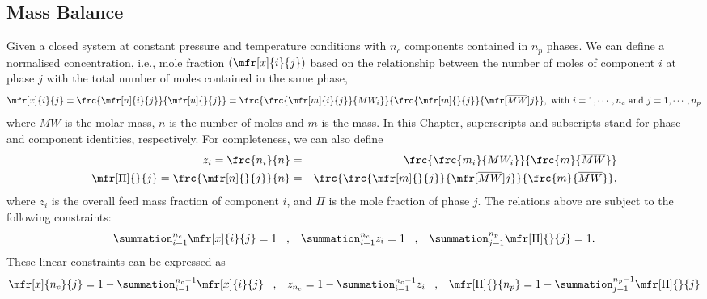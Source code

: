 \documentclass[12pt,a4paper,oneside]{report}%
\begin{document}
\subsection{Mass Balance}\label{Chapter:ThermodynamicFormulation:Section:MassBalance}
Given a closed system at constant pressure and temperature conditions with $n_{c}$ components contained in $n_{p}$ phases. We can define a normalised concentration, i.e., mole fraction $\left(\mfr[x]{i}{j}\right)$ based on the relationship between the number of moles of component $i$ at phase $j$ with the total number of moles contained in the same phase, 
\begin{equation}
    \mfr[x]{i}{j} = \frc{\mfr[n]{i}{j}}{\mfr[n]{}{j}} = \frc{\frc{\mfr[m]{i}{j}}{MW_{i}}}{\frc{\mfr[m]{}{j}}{\mfr[\overline{MW}]{}{j}}}, \hfill \text{ with } i=1, \cdots, n_{c} \text{ and } j=1, \cdots, n_{p}
\label{Chapter:ThermodynamicFormulation:Eqn:MoleFractionDef}
\end{equation}
where $MW$ is the molar mass, $n$ is the number of moles and $m$ is the mass. In this Chapter, superscripts and subscripts stand for phase and component identities, respectively.  For completeness, we can also define
\begin{eqnarray}
    z_{i} = \frc{n_{i}}{n} &=& \frc{\frc{m_{i}}{MW_{i}}}{\frc{m}{\overline{MW}}}\label{Chapter:ThermodynamicFormulation:Eqn:FeedFractionDef} \\
    \mfr[\Pi]{}{j} = \frc{\mfr[n]{}{j}}{n} &=& \frc{\frc{\mfr[m]{}{j}}{\mfr[\overline{MW}]{}{j}}}{\frc{m}{\overline{MW}}},\label{Chapter:ThermodynamicFormulation:Eqn:PhaseFractionDef} 
\end{eqnarray}
where $z_{i}$ is the overall feed mass fraction of component $i$, and $\Pi$ is the mole fraction of phase $j$. The relations above are subject to the following constraints:
\begin{equation}
    \summation_{i=1}^{n_{c}}\mfr[x]{i}{j} = 1 \;\;\;,\;\;\; \summation_{i=1}^{n_{c}}z_{i} = 1 \;\;\;,\;\;\; \summation_{j=1}^{n_{p}}\mfr[\Pi]{}{j} = 1. \label{Chapter:ThermodynamicFormulation:Eqn:FractionConstraints1}
\end{equation}
These linear constraints can be expressed as
\begin{equation}
    \mfr[x]{n_{c}}{j}= 1 - \summation_{i=1}^{n_{c}-1}\mfr[x]{i}{j} \;\;\;,\;\;\; z_{n_{c}}= 1 - \summation_{i=1}^{n_{c}-1}z_{i} \;\;\;,\;\;\; \mfr[\Pi]{}{n_{p}} = 1 - \summation_{j=1}^{n_{p}-1}\mfr[\Pi]{}{j} \label{Chapter:ThermodynamicFormulation:Eqn:FractionConstraints2}
\end{equation}
\end{document}
